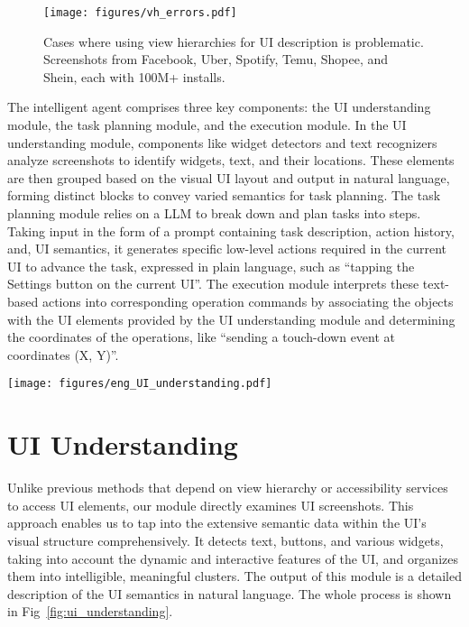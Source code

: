 \begin{figure}
    \centering
    \texttt{[image: figures/vh\_errors.pdf]}
    \caption{Cases where using view hierarchies for UI description is problematic. Screenshots from Facebook, Uber, Spotify, Temu, Shopee, and Shein, each with 100M+ installs.}
    \label{fig:vh_errors}
\end{figure}

The intelligent agent comprises three key components: the UI understanding module, the task planning module, and the execution module. In the UI understanding module, components like widget detectors and text recognizers analyze screenshots to identify widgets, text, and their locations. These elements are then grouped based on the visual UI layout and output in natural language, forming distinct blocks to convey varied semantics for task planning. The task planning module relies on a LLM to break down and plan tasks into steps. Taking input in the form of a prompt containing task description, action history, and, UI semantics, it generates specific low-level actions required in the current UI to advance the task, expressed in plain language, such as ``tapping the Settings button on the current UI''. The execution module interprets these text-based actions into corresponding operation commands by associating the objects with the UI elements provided by the UI understanding module and determining the coordinates of the operations, like ``sending a touch-down event at coordinates (X, Y)''.

\begin{figure*}
    \centering
    \texttt{[image: figures/eng\_UI\_understanding.pdf]}
    \caption{The process of vision based UI understanding.}
    \label{fig:ui_understanding}
\end{figure*}

\section{UI Understanding}
Unlike previous methods that depend on view hierarchy or accessibility services to access UI elements, our module directly examines UI screenshots. This approach enables us to tap into the extensive semantic data within the UI's visual structure comprehensively. It detects text, buttons, and various widgets, taking into account the dynamic and interactive features of the UI, and organizes them into intelligible, meaningful clusters. The output of this module is a detailed description of the UI semantics in natural language. The whole process is shown in Fig~\ref{fig:ui_understanding}.

